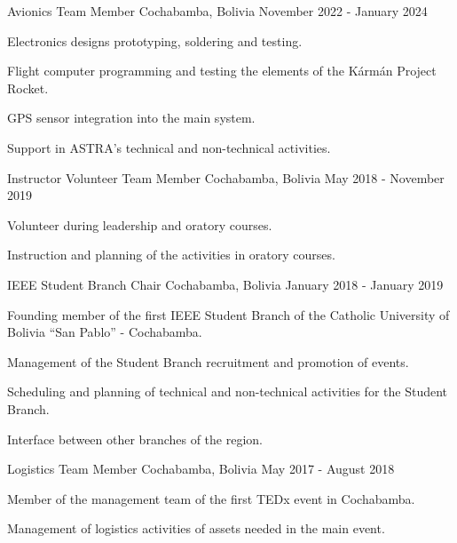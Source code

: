 

\begin{cventries}
  {Avionics Team Member}
  {Cochabamba, Bolivia}
  {November 2022 - January 2024}
  {%
    \begin{cvitems}
      \item Electronics designs prototyping, soldering and testing.
      \item Flight computer programming and testing the elements of
      the Kármán Project Rocket.
      \item GPS sensor integration into the main system.
      \item Support in ASTRA's technical and non-technical activities.
    \end{cvitems}
  }%

  {Instructor Volunteer Team Member}
  {Cochabamba, Bolivia}
  {May 2018 - November 2019}
  {%
    \begin{cvitems}
      \item Volunteer during leadership and oratory courses.
      \item Instruction and planning of the activities in oratory
      courses.
    \end{cvitems}
  }

  {IEEE Student Branch Chair}
  {Cochabamba, Bolivia} 
  {January 2018 - January 2019} 
  {%
    \begin{cvitems}
      \item Founding member of the first IEEE Student Branch of the
      Catholic University of Bolivia ``San Pablo'' - Cochabamba.
      \item Management of the Student Branch recruitment and promotion
      of events.
      \item Scheduling and planning of technical and non-technical
      activities for the Student Branch.
      \item Interface between other branches of the region.
    \end{cvitems}
  }

  {Logistics Team Member}
  {Cochabamba, Bolivia}
  {May 2017 - August 2018}
  {%
    \begin{cvitems}
      \item Member of the management team of the first TEDx event in
      Cochabamba.
      \item Management of logistics activities of assets needed in the
      main event.
    \end{cvitems}
  }

\end{cventries}
